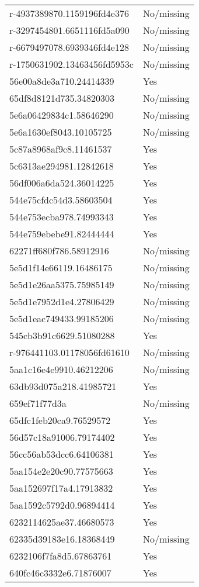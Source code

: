\begin{tabular}{ll}
r-4937389870.1159196fd4e376 & No/missing \\
r-3297454801.6651116fd5a090 & No/missing \\
r-6679497078.6939346fd4e128 & No/missing \\
r-1750631902.13463456fd5953c & No/missing \\
56e00a8de3a710.24414339 & Yes \\
65df8d8121d735.34820303 & No/missing \\
5e6a06429834c1.58646290 & No/missing \\
5e6a1630ef8043.10105725 & No/missing \\
5c87a8968af9c8.11461537 & Yes \\
5c6313ae294981.12842618 & Yes \\
56df006a6da524.36014225 & Yes \\
544e75cfdc54d3.58603504 & Yes \\
544e753ecba978.74993343 & Yes \\
544e759ebebe91.82444444 & Yes \\
62271ff680f786.58912916 & No/missing \\
5e5d1f14e66119.16486175 & No/missing \\
5e5d1e26aa5375.75985149 & No/missing \\
5e5d1e7952d1e4.27806429 & No/missing \\
5e5d1eac749433.99185206 & No/missing \\
545cb3b91c6629.51080288 & Yes \\
r-976441103.01178056fd61610 & No/missing \\
5aa1c16e4e9910.46212206 & No/missing \\
63db93d075a218.41985721 & Yes \\
659ef71f77d3a & No/missing \\
65dfc1feb20ca9.76529572 & Yes \\
56d57c18a91006.79174402 & Yes \\
56cc56ab53dcc6.64106381 & Yes \\
5aa154e2e20c90.77575663 & Yes \\
5aa152697f17a4.17913832 & Yes \\
5aa1592c5792d0.96894414 & Yes \\
6232114625ae37.46680573 & Yes \\
62335d39183e16.18368449 & No/missing \\
6232106f7fa8d5.67863761 & Yes \\
640fc46c3332e6.71876007 & Yes \\

\end{tabular}

